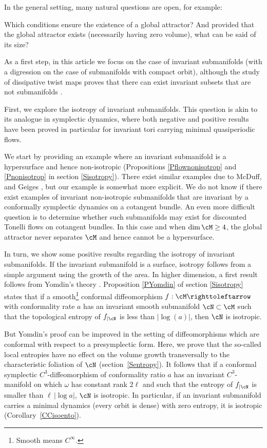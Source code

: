 In the general setting, many natural questions are open, for example:

\begin{questions*}
Which conditions ensure the existence of a global attractor? And provided that the global attractor exists (necessarily having zero volume), what can be said of its size?
\end{questions*}

As a first step, in this article we focus on the case of invariant submanifolds (with a digression on the case of submanifolds with compact orbit), although the study of dissipative twist maps proves that there can exist invariant subsets that are not submanifolds \cite{LeCalvez1988}.

First, we explore the isotropy of invariant submanifolds. This question is akin to its analogue in symplectic dynamics, where both negative and positive results have been proved in particular for invariant tori carrying minimal quasiperiodic flows.

We start by providing an example where an invariant submanifold is a hypersurface and hence non-isotropic (Propositions \ref{Pflownonisotrop} and \ref{Pnonisotrop} in section \ref{Sisotropy}). There exist similar examples due to McDuff, \cite{McDuff1991} and Geiges \cite{Geiges1994,Geiges1995}, but our example is somewhat more explicit. We do not know if there exist examples of invariant non-isotropic submanifolds that are invariant by a conformally symplectic dynamics on a cotangent bundle. An even more difficult question is to determine whether such submanifolds may exist for discounted Tonelli flows on cotangent bundles. In this case and when $\dim \cM\geq 4$, the global attractor never separates $\cM$ and hence cannot be a hypersurface.

In turn, we show some positive results regarding the isotropy of invariant submanifolds. If the invariant submanifold is a surface, isotropy follows from a simple argument using the growth of the area. In higher dimension, a first result follows from Yomdin's theory \cite{Yom1987, Gromov1987}. Proposition \ref{PYomdin} of section \ref{Sisotropy} states that if a smooth\footnote{Smooth means $C^\infty$.} conformal diffeomorphism $f: \cM \righttoleftarrow$ with conformality rate $a$ has an invariant smooth submanifold $\cN \subset \cM$ such that the topological entropy of $f_{|\cN}$ is less than $|\log(a)|$, then $\cN$ is isotropic.

But Yomdin's proof can be improved in the setting of diffeomorphisms which are conformal with respect to a presymplectic form. Here, we prove that the so-called local entropies have no effect on the volume growth transversally to the characteristic foliation of $\cN$ (section~\ref{Sentropy}). It follows that if a conformal symplectic $C^3$-diffeomorphism
of conformality ratio $a$ has an invariant $C^3$-manifold on which $\omega$ has constant rank $2\ell$ and such that the entropy of $f_{|\cN}$ is smaller than $\ell\, |\log a|$, $\cN$ is isotropic. In particular, if an invariant submanifold carries a minimal dynamics (every orbit is dense) with zero entropy, it is isotropic (Corollary~\ref{CCisoento}).


